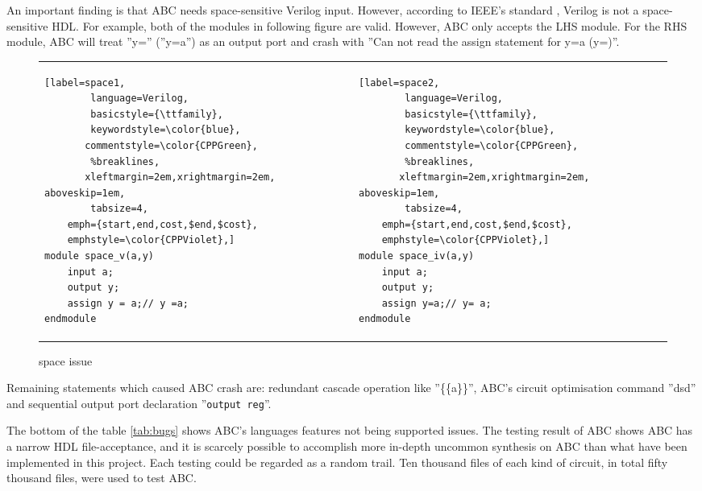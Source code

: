 An important finding is that ABC needs space-sensitive Verilog input. However, according to IEEE's standard \cite{ieee2001}, Verilog is not a space-sensitive HDL. For example, both of the modules in following figure are valid. However, ABC only accepts the LHS module. For the RHS module, ABC will treat ''y='' (''y=a'') as an output port and crash with ''Can not read the assign statement for y=a (y=)''.
\begin{figure}[htb]
\begin{tabular}{p{}p{}}
    \begin{minipage}{0.45\textwidth}
    \begin{lstlisting}[label=space1,
        language=Verilog,
        basicstyle={\ttfamily},
        keywordstyle=\color{blue}, 
       commentstyle=\color{CPPGreen},
        %breaklines,
       xleftmargin=2em,xrightmargin=2em, aboveskip=1em,
        tabsize=4,
	emph={start,end,cost,$end,$cost},
	emphstyle=\color{CPPViolet},]
module space_v(a,y)
    input a;
    output y;
    assign y = a;// y =a;
endmodule
\end{lstlisting}

    \end{minipage}
    &
    \begin{minipage}{0.45\textwidth}
\begin{lstlisting}[label=space2,
        language=Verilog,
        basicstyle={\ttfamily},
        keywordstyle=\color{blue}, 
        commentstyle=\color{CPPGreen},
        %breaklines,
       xleftmargin=2em,xrightmargin=2em, aboveskip=1em,
        tabsize=4,
	emph={start,end,cost,$end,$cost},
	emphstyle=\color{CPPViolet},]
module space_iv(a,y)
    input a;
    output y;
    assign y=a;// y= a;
endmodule
\end{lstlisting}

\end{minipage}
\end{tabular}
    \caption{\footnotesize space issue}
\end{figure}
Remaining statements which caused ABC crash are: redundant cascade operation like ''\{\{a\}\}'', ABC's circuit optimisation command ''dsd'' and sequential output port declaration ''\texttt{output reg}''.

The bottom of the table \ref{tab:bugs} shows ABC's languages features not being supported issues. The testing result of ABC shows ABC has a narrow HDL file-acceptance, and it is scarcely possible to accomplish more in-depth uncommon synthesis on ABC than what have been implemented in this project. Each testing could be regarded as a random trail. Ten thousand files of each kind of circuit, in total fifty thousand files, were used to test ABC. 


